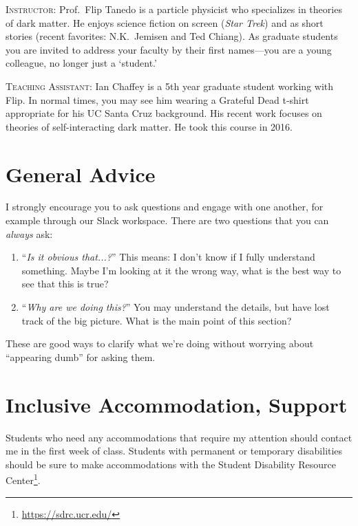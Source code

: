 \documentclass[12pt]{article}
\numberwithin{equation}{section}    %
\begin{document}
\noindent \textsc{Instructor}: Prof.~Flip Tanedo is a particle physicist who specializes in theories of dark matter. He enjoys science fiction on screen (\emph{Star Trek}) and as short stories (recent favorites: N.K.~Jemisen and Ted Chiang). As graduate students you are invited to address your faculty by their first names---you are a young colleague, no longer just a `student.' 

\vspace{.5em}
\noindent \textsc{Teaching Assistant}: Ian Chaffey is a 5th year graduate student working with Flip. In normal times, you may see him wearing a Grateful Dead t-shirt appropriate for his UC Santa Cruz background. His recent work focuses on theories of self-interacting dark matter. He took this course in 2016.

\section*{General Advice}

I strongly encourage you to ask questions and engage with one another, for example through our Slack workspace. There are two questions that you can \emph{always} ask:
\begin{enumerate}
	\item ``\emph{Is it obvious that...?}'' This means: I don't know if I fully understand something. Maybe I'm looking at it the wrong way, what is the best way to see that this is true? 
	\item ``\emph{Why are we doing this?}'' You may understand the details, but have lost track of the big picture. What is the main point of this section?
\end{enumerate}
These are good ways to clarify what we're doing without worrying about ``appearing dumb'' for asking them. 



\section*{Inclusive Accommodation, Support}

Students who need any accommodations that require my attention should contact me in the first week of class. Students with permanent or temporary disabilities should be sure to make accommodations with the Student Disability Resource Center\footnote{\url{https://sdrc.ucr.edu/}}.
\end{document}
